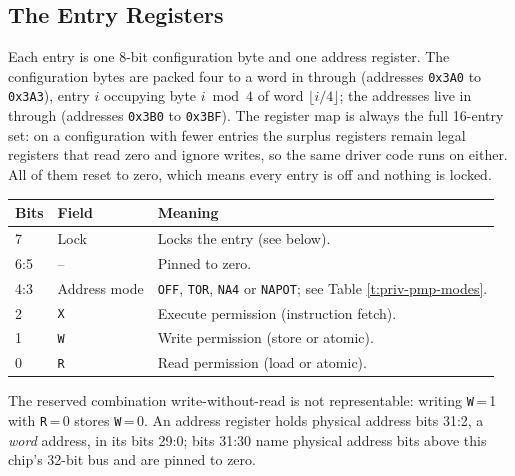 \subsection{The Entry Registers}

Each entry is one 8-bit configuration byte and one address register. The configuration bytes are packed four to a word in  through  (addresses \texttt{0x3A0} to \texttt{0x3A3}), entry $i$ occupying byte $i \bmod 4$ of word $\lfloor i/4 \rfloor$; the addresses live in  through  (addresses \texttt{0x3B0} to \texttt{0x3BF}). The register map is always the full 16-entry set: on a configuration with fewer entries the surplus registers remain legal registers that read zero and ignore writes, so the same driver code runs on either. All of them reset to zero, which means every entry is off and nothing is locked.

\begin{center}
\begin{tabular}{ l l p{10.0cm} }
	\textbf{Bits} & \textbf{Field} & \textbf{Meaning} \\ \hline
	7 & Lock & Locks the entry (see below). \\
	6:5 & -- & Pinned to zero. \\
	4:3 & Address mode & \texttt{OFF}, \texttt{TOR}, \texttt{NA4} or \texttt{NAPOT}; see Table \ref{t:priv-pmp-modes}. \\
	2 & \texttt{X} & Execute permission (instruction fetch). \\
	1 & \texttt{W} & Write permission (store or atomic). \\
	0 & \texttt{R} & Read permission (load or atomic). \\ \hline
\end{tabular}
\end{center}

The reserved combination write-without-read is not representable: writing \texttt{W}\,=\,1 with \texttt{R}\,=\,0 stores \texttt{W}\,=\,0. An address register holds physical address bits 31:2, a \textit{word} address, in its bits 29:0; bits 31:30 name physical address bits above this chip's 32-bit bus and are pinned to zero.

